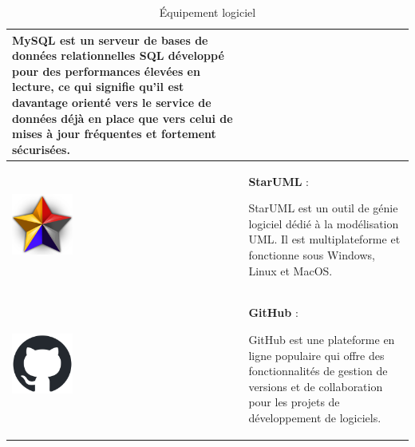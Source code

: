 \documentclass{article}
\begin{document}
\begin{table}[h!]
\begin{tabular}{|m{2cm}|m{12cm}|}
                            MySQL est un serveur de bases de données relationnelles SQL développé pour des performances élevées en lecture, ce qui signifie qu'il est davantage orienté vers le service de données déjà en place que vers celui de mises à jour fréquentes et fortement sécurisées. \\
                            \hline
                            \includegraphics[width=2cm]{assets/logos/staruml-icon.png} &
                            \textbf{StarUML} :
                            
                            StarUML est un outil de génie logiciel dédié à la modélisation UML. Il est multiplateforme et fonctionne sous Windows, Linux et MacOS. \\
                            \hline
                            \includegraphics[width=2cm]{assets/logos/github-mark.png} &
                            \textbf{GitHub} :
                            
                            GitHub est une plateforme en ligne populaire qui offre des fonctionnalités de gestion de versions et de collaboration pour les projets de développement de logiciels. \\
                            \hline
                        \end{tabular}
                        \caption{Équipement logiciel}
                    \end{table}
                \FloatBarrier
\end{document}
